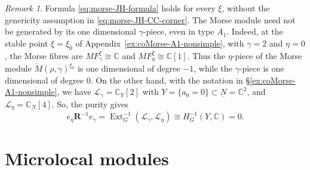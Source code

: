 \documentclass[11pt,reqno]{amsart}
\theoremstyle{definition}
\theoremstyle{remark}
\newtheorem{Remark}[Theorem]{Remark}
\def\bbC{\mathbb C}
\def\dN{\underline N}
\def\dG{\underline G}
\def\bR{\mathbf R}
\begin{document}
\begin{Remark}
Formula \eqref{eq:morse-JH-formula} holds for every $\xi$,
without the genericity assumption in \eqref{eq:morse-JH-CC-corner}.
The Morse module need not be generated by its one dimensional
$\gamma$-piece, even in type $A_1$. Indeed, at the stable
point $\xi=\xi_0$ of Appendix~\ref{ex:coMorse-A1-nonsimple}, with
$\gamma=2$ and $\eta=0$, the  Morse fibres are
$MF^\xi_\gamma\cong\bbC$ and $MF^\xi_\eta\cong\bbC[1]$.
Thus the $\eta$-piece of the Morse module $\mathring M(\rho,\gamma)^{\xi_0}$ 
is one dimensional of degree $-1$, while the $\gamma$-piece is one dimensional of
degree $0$. On the other hand, with the notation in \S\ref{ex:coMorse-A1-nonsimple},
we have $\mathscr L_\gamma=\bbC_Y[2]$ with
$Y=\{a_0=0\}\subset\dN=\bbC^2$, and $\mathscr L_\eta=\bbC_{\dN}[4]$.
So, the purity gives
\[
 e_\eta\bR^{-1}e_\gamma
 =\operatorname{Ext}^{-1}_{\dG}(\mathscr L_\gamma,\mathscr L_\eta)
 \cong H^{-1}_{\dG}(Y,\bbC)=0.
\]
\end{Remark}

\section{Microlocal modules}\label{sec:micro}
\end{document}
